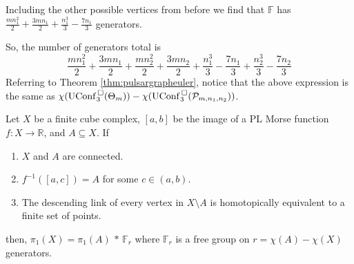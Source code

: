 Including the other possible vertices from before we find that \(\mathbb{F}\) has
\(\frac{m n_{1}^{2}}{2} + \frac{3 m n_{1}}{2} + \frac{n_{1}^{3}}{3} - \frac{7 n_{1}}{3}\)
generators.


So, the number of generators total is
\[
\frac{m n_{1}^{2}}{2} + \frac{3 m n_{1}}{2} + \frac{m n_{2}^{2}}{2} + \frac{3 m n_{2}}{2} + \frac{n_{1}^{3}}{3} - \frac{7 n_{1}}{3} + \frac{n_{2}^{3}}{3} - \frac{7 n_{2}}{3}
\]
Referring to Theorem \ref{thm:pulsargrapheuler}, 
notice that the above expression is the same as \(\chi(\mathrm{UConf}^{\,\square}_3(\Theta_m)) - \chi(\mathrm{UConf}^{\,\square}_3(\mathcal{P}_{m,n_1,n_2}))\).


\begin{cor}
    \label{cor:eulerfreegroup}
    Let \(X\) be a finite cube complex,
    \([a,b]\) be the image of a PL Morse function \(f: X \rightarrow \mathbb{R}\),
    and \(A \subseteq X\).
    If
    \begin{enumerate}[label=(\roman*)]
        \item \(X\) and \(A\) are connected.
        \item \(f^{-1}([a,c]) = A\) for some \(c \in (a,b)\).
        \item The descending link of every vertex in \(X \setminus A\) is homotopically equivalent to a finite set of points. 
    \end{enumerate}
    then,
    \(\pi_1(X) = \pi_1(A)\,*\, \mathbb{F}_r\) where \(\mathbb{F}_r\) is a free group on \(r = \chi(A) - \chi(X)\) generators.
\end{cor}
